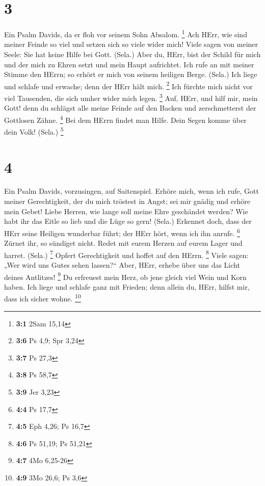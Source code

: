 \hypertarget{section-1}{%
\section{3}\label{section-1}}

 Ein Psalm Davids, da er floh vor seinem Sohn Absalom.
\footnote{\textbf{3:1} 2Sam 15,14}  Ach HErr, wie sind
meiner Feinde so viel und setzen sich so viele wider mich! 
Viele sagen von meiner Seele: Sie hat keine Hilfe bei Gott. (Sela.)
 Aber du, HErr, bist der Schild für mich und der mich zu
Ehren setzt und mein Haupt aufrichtet.  Ich rufe an mit
meiner Stimme den HErrn; so erhört er mich von seinem heiligen Berge.
(Sela.)  Ich liege und schlafe und erwache; denn der HErr
hält mich. \footnote{\textbf{3:6} Ps 4,9; Spr 3,24}  Ich
fürchte mich nicht vor viel Tausenden, die sich umher wider mich legen.
\footnote{\textbf{3:7} Ps 27,3}  Auf, HErr, und hilf mir,
mein Gott! denn du schlägst alle meine Feinde auf den Backen und
zerschmetterst der Gottlosen Zähne. \footnote{\textbf{3:8} Ps 58,7}
 Bei dem HErrn findet man Hilfe. Dein Segen komme über dein
Volk! (Sela.) \footnote{\textbf{3:9} Jer 3,23}

\hypertarget{section-2}{%
\section{4}\label{section-2}}

 Ein Psalm Davids, vorzusingen, auf Saitenspiel.
 Erhöre mich, wenn ich rufe, Gott meiner Gerechtigkeit, der
du mich tröstest in Angst; sei mir gnädig und erhöre mein Gebet!
 Liebe Herren, wie lange soll meine Ehre geschändet werden?
Wie habt ihr das Eitle so lieb und die Lüge so gern! (Sela.)
 Erkennet doch, dass der HErr seine Heiligen wunderbar
führt; der HErr hört, wenn ich ihn anrufe. \footnote{\textbf{4:4} Ps
  17,7}  Zürnet ihr, so sündiget nicht. Redet mit eurem
Herzen auf eurem Lager und harret. (Sela.) \footnote{\textbf{4:5} Eph
  4,26; Ps 16,7}  Opfert Gerechtigkeit und hoffet auf den
HErrn. \footnote{\textbf{4:6} Ps 51,19; Ps 51,21}  Viele
sagen: „Wer wird uns Gutes sehen lassen?{}`` Aber, HErr, erhebe über uns
das Licht deines Antlitzes! \footnote{\textbf{4:7} 4Mo 6,25-26}
 Du erfreuest mein Herz, ob jene gleich viel Wein und Korn
haben.  Ich liege und schlafe ganz mit Frieden; denn allein
du, HErr, hilfst mir, dass ich sicher wohne. \footnote{\textbf{4:9} 3Mo
  26,6; Ps 3,6}

